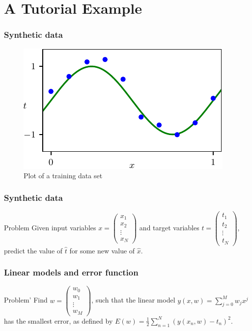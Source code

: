 \documentclass{beamer}
\begin{document}
\section{A Tutorial Example}

\begin{frame}
    \frametitle{Synthetic data}
    \begin{figure}
        \caption{Plot of a training data set}
        \includegraphics{Figure_4.pdf}
    \end{figure}
\end{frame}

\begin{frame}
    \frametitle{Synthetic data}
    \begin{block}{Problem}
        Given input variables $x=\begin{pmatrix}
            x_{1} \\
            x_{2} \\
            \vdots \\
            x_{N}
        \end{pmatrix}$ and target variables $t=\begin{pmatrix}
            t_{1} \\
            t_{2} \\
            \vdots \\
            t_{N}
        \end{pmatrix}$, predict the value of $\hat{t}$ for some new value of $\hat{x}$.
    \end{block}
\end{frame}

\begin{frame}
    \frametitle{Linear models and error function}
    \begin{block}{Problem'}
        Find $w=\begin{pmatrix}
            w_{0} \\
            w_{1} \\
            \vdots \\
            w_{M}
        \end{pmatrix}$, such that the linear model $y(x,w)=\sum_{j=0}^{M}w_{j}x^{j}$ has the smallest error, as defined by $E(w)=\frac{1}{2}\sum_{n=1}^{N}(y(x_{n},w)-t_{n})^{2}$.
    \end{block}
\end{frame}
\end{document}
